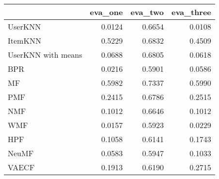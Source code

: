 \begin{tabular}{lrrr}
\toprule
{} &  eva\_one &  eva\_two &  eva\_three \\
\midrule
UserKNN            &   0.0124 &   0.6654 &     0.0108 \\
ItemKNN            &   0.5229 &   0.6832 &     0.4509 \\
UserKNN with means &   0.0688 &   0.6805 &     0.0618 \\
BPR                &   0.0216 &   0.5901 &     0.0586 \\
MF                 &   0.5982 &   0.7337 &     0.5990 \\
PMF                &   0.2415 &   0.6786 &     0.2515 \\
NMF                &   0.1012 &   0.6646 &     0.1012 \\
WMF                &   0.0157 &   0.5923 &     0.0229 \\
HPF                &   0.1058 &   0.6141 &     0.1743 \\
NeuMF              &   0.0583 &   0.5947 &     0.1033 \\
VAECF              &   0.1913 &   0.6190 &     0.2715 \\
\bottomrule
\end{tabular}
